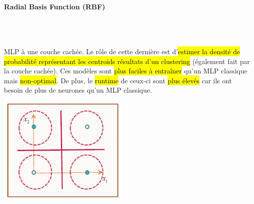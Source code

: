 \documentclass[letterpaper, 12pt]{article}
\begin{document}
				\paragraph{Radial Basis Function (RBF)} ~\\~\\
					\begin{minipage}{0.65\textwidth}
						MLP à une couche cachée. Le rôle de cette dernière est d'\hl{estimer la
					densité de probabilité représentant les centroids résultats d'un clustering} (également fait par la couche cachée). 
					Ces modèles sont \hl{plus faciles à entraîner} qu'un MLP classique mais \hl{non-optimal}. De plus, le \hl{runtime}
					de ceux-ci sont \hl{plus élevés} car ils ont besoin de plus de neurones qu'un MLP classique.
					\end{minipage}\hfill
					\begin{minipage}{0.33\textwidth}
						\begin{center}
							\includegraphics[width=2.5in]{Images/rbf}
						\end{center}			
					\end{minipage} 
\end{document}

